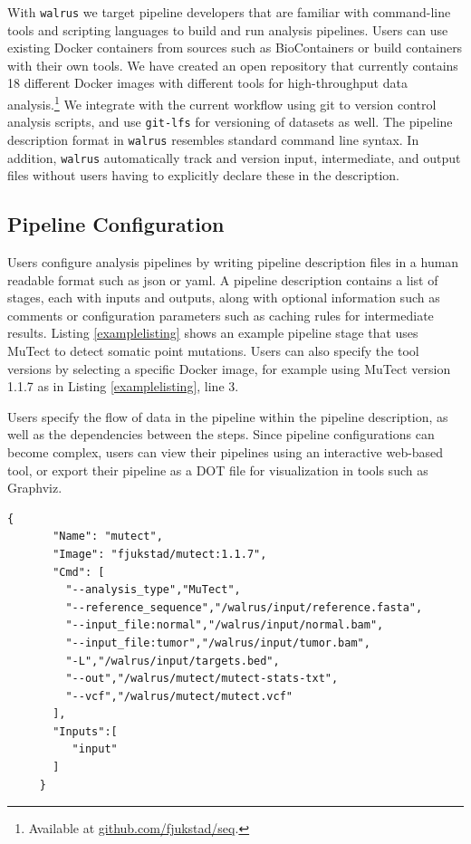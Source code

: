 With \texttt{walrus} we target pipeline developers that are familiar with
command-line tools and scripting languages to build and run analysis pipelines.
Users can use existing Docker containers from sources such as
BioContainers\cite{biocontainers} or build containers with their own tools. We
have created an open repository that currently contains 18 different Docker
images with different tools for high-throughput data
analysis.\footnote{Available at \url{github.com/fjukstad/seq}.}  We
integrate with the current workflow using git to version control analysis
scripts, and use \texttt{git-lfs} for versioning of datasets as well.  The
pipeline description format in \texttt{walrus} resembles standard command line
syntax. In addition, \texttt{walrus} automatically track and version input,
intermediate, and output files without users having to explicitly declare these
in the description. 

\subsection{Pipeline Configuration}
Users configure analysis pipelines by writing pipeline description files in a
human readable format such as \gls{json} or \gls{yaml}. A pipeline description
contains a list of stages, each with inputs and outputs, along with optional
information such as comments or configuration parameters such as caching rules
for intermediate results. Listing \ref{examplelisting} shows an example pipeline
stage that uses MuTect\cite{mutect} to detect somatic point mutations. Users
can also specify the tool versions by selecting a specific Docker image, for
example using MuTect version 1.1.7 as in Listing \ref{examplelisting}, line 3. 

Users specify the flow of data in the pipeline within the pipeline description,
as well as the dependencies between the steps. Since pipeline configurations can
become complex, users can view their pipelines using an interactive web-based
tool, or export their pipeline as a DOT file for visualization in tools such as
Graphviz.\cite{ellson2001graphviz}

\begin{lstlisting}[caption={Example pipeline stage for a tool that detects
somatic point mutations. It reads a reference sequence file together with both
tumor and normal sequences, and produces an output file with the detected
mutations.},
label={examplelisting}, 
basicstyle=\ttfamily\scriptsize]
     {
       "Name": "mutect",
       "Image": "fjukstad/mutect:1.1.7",
       "Cmd": [
         "--analysis_type","MuTect",
         "--reference_sequence","/walrus/input/reference.fasta",
         "--input_file:normal","/walrus/input/normal.bam",
         "--input_file:tumor","/walrus/input/tumor.bam",
         "-L","/walrus/input/targets.bed",
         "--out","/walrus/mutect/mutect-stats-txt",
         "--vcf","/walrus/mutect/mutect.vcf"
       ],
       "Inputs":[
          "input" 
       ]
     }
\end{lstlisting}

